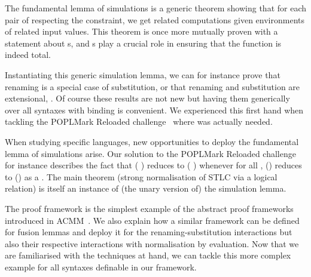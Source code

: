 The fundamental lemma of simulations is a generic theorem showing that for
each pair of \semrec{} respecting the  constraint, we
get related computations given environments of related input values.
This theorem is once more mutually
proven with a statement about s,
and s play a crucial role in ensuring that the function is indeed total.

\begin{agdasnippet}
  \addtolength{\leftskip}{\parindent}
\end{agdasnippet}

Instantiating this generic simulation lemma, we can for instance prove
that renaming is a special case of substitution, or that renaming and
substitution are extensional, . Of course these
results are not new but having them generically over all syntaxes with
binding is convenient. We experienced this first hand when tackling the
POPLMark Reloaded challenge~\citeyear{poplmarkreloaded} where
 was actually needed.

\begin{agdasnippet}
\end{agdasnippet}

When studying specific languages, new opportunities to deploy the
fundamental lemma of simulations arise. Our solution to the POPLMark
Reloaded challenge for instance describes the fact that
{( \AB{$\rho$} )}
reduces to {(  )} whenever for all ,
\AB{$\rho$}() reduces to () as a .
The main theorem (strong normalisation of STLC via a logical relation)
is itself an instance of (the unary version of) the simulation lemma.

The  proof framework is the simplest example of the abstract
proof frameworks introduced in ACMM~\citeyear{allais2017type}. We also
explain how a similar framework can be defined
for fusion lemmas and deploy it for the renaming-substitution interactions
but also their respective interactions with normalisation by evaluation.
Now that we are familiarised with the techniques at hand, we can tackle
this more complex example for all syntaxes definable in our framework.


